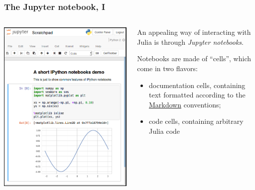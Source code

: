 \documentclass[english,serif,mathserif,xcolor=pdftex,dvipsnames,table]{beamer}
\begin{document}
\begin{frame}
  \frametitle{The Jupyter notebook, I}

  \begin{columns}[t]
    \begin{column}{0.5\textwidth}
      \begin{center}
        \includegraphics[width=1.00\linewidth]{fig/nb.png}
      \end{center}
    \end{column}
    \begin{column}{0.5\textwidth}
      \small

      An appealing way of interacting with Julia
      is through \emph{Jupyter notebooks}.

      \+
      Notebooks are made of ``cells'', which come in two flavors:
      \begin{itemize}
      \item documentation cells, containing text formatted according to the
        \href{http://commonmark.org/help/}{Markdown} conventions;
      \item code cells, containing arbitrary Julia code
      \end{itemize}
    \end{column}
  \end{columns}
\end{frame}
\end{document}

